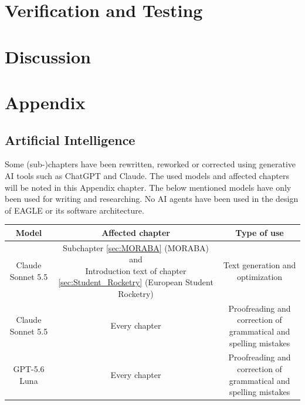 \documentclass[fontsize=11pt,%
twoside,%
BCOR          = 8mm, %
DIV           = 11,  %
titlepage     = off,%
index=totoc,%
xcolor        = pdftex,%
dvipsnames,%
bibliography  = totoc,%
bibliography = numbered, %
listof        = notnumbered]{scrreprt}
\begin{document}
\newpage

\chapter{Verification and Testing}

\newpage


\chapter{Discussion}

\newpage
\printbibliography %

\setcounter{page}{1}
\chapter{Appendix}

\section{Artificial Intelligence}\label{sec:AI}
Some (sub-)chapters have been rewritten, reworked or corrected using generative AI tools such as ChatGPT and Claude. The used models and affected chapters will be noted in this Appendix chapter. The below mentioned models have only been used for writing and researching. No AI agents have been used in the design of EAGLE or its software architecture.


\begin{center}
	\label{tab:AI}
	\begin{adjustbox}{width=\textwidth}	
		\begin{tabular}{|c|c|c|} \hline		
			\textbf{Model} & \textbf{Affected chapter} & \textbf{Type of use} \\ \hline\hline
			Claude Sonnet 5.5 & \makecell{Subchapter \ref{sec:MORABA} (MORABA) and\\Introduction text of chapter \ref{sec:Student_Rocketry} (European Student Rocketry)} & Text generation and optimization \\ \hline
			Claude Sonnet 5.5 & Every chapter & \makecell{Proofreading and correction of \\grammatical and spelling mistakes} \\ \hline
			GPT-5.6 Luna & Every chapter & \makecell{Proofreading and correction of \\grammatical and spelling mistakes}  \\ \hline			
		\end{tabular}
	\end{adjustbox}
\end{center}
\end{document}
